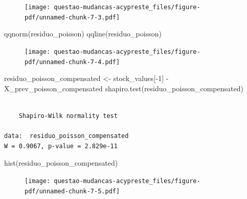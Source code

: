 \documentclass[
  letterpaper,
  DIV=11,
  numbers=noendperiod]{scrreprt}
\newenvironment{Shaded}{\begin{snugshade}}{\end{snugshade}}
\newcommand{\DecValTok}[1]{\textcolor[rgb]{0.68,0.00,0.00}{#1}}
\newcommand{\FunctionTok}[1]{\textcolor[rgb]{0.28,0.35,0.67}{#1}}
\newcommand{\NormalTok}[1]{\textcolor[rgb]{0.00,0.23,0.31}{#1}}
\newcommand{\OtherTok}[1]{\textcolor[rgb]{0.00,0.23,0.31}{#1}}
\newcommand{\SpecialCharTok}[1]{\textcolor[rgb]{0.37,0.37,0.37}{#1}}
\begin{document}
\begin{figure}[H]

{\centering \texttt{[image: questao-mudancas-acypreste\_files/figure-pdf/unnamed-chunk-7-3.pdf]}

}

\end{figure}

\begin{Shaded}
\begin{Highlighting}[]
\FunctionTok{qqnorm}\NormalTok{(residuo\_poisson)}
\FunctionTok{qqline}\NormalTok{(residuo\_poisson)}
\end{Highlighting}
\end{Shaded}

\begin{figure}[H]

{\centering \texttt{[image: questao-mudancas-acypreste\_files/figure-pdf/unnamed-chunk-7-4.pdf]}

}

\end{figure}

\begin{Shaded}
\begin{Highlighting}[]
\NormalTok{residuo\_poisson\_compensated }\OtherTok{\textless{}{-}}\NormalTok{ stock\_values[}\SpecialCharTok{{-}}\DecValTok{1}\NormalTok{] }\SpecialCharTok{{-}}\NormalTok{ X\_prev\_poisson\_compensated}
\FunctionTok{shapiro.test}\NormalTok{(residuo\_poisson\_compensated)}
\end{Highlighting}
\end{Shaded}

\begin{verbatim}

    Shapiro-Wilk normality test

data:  residuo_poisson_compensated
W = 0.9067, p-value = 2.829e-11
\end{verbatim}

\begin{Shaded}
\begin{Highlighting}[]
\FunctionTok{hist}\NormalTok{(residuo\_poisson\_compensated)}
\end{Highlighting}
\end{Shaded}

\begin{figure}[H]

{\centering \texttt{[image: questao-mudancas-acypreste\_files/figure-pdf/unnamed-chunk-7-5.pdf]}

}

\end{figure}
\end{document}
